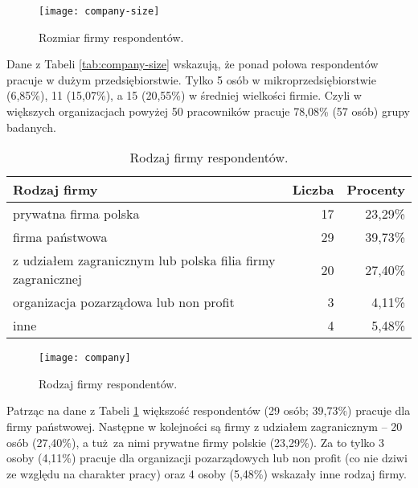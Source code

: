 \begin{figure}[htb]
\begin{center}
\texttt{[image: company-size]}
\end{center}
\caption{Rozmiar firmy respondentów.}
\label{fig:company-size}
\end{figure}

Dane z Tabeli \ref{tab:company-size} wskazują, że ponad połowa respondentów pracuje w dużym przedsiębiorstwie. Tylko 5 osób w mikroprzedsiębiorstwie (6,85\%), 11 (15,07\%), a 15 (20,55\%) w średniej wielkości firmie. Czyli w większych organizacjach powyżej 50 pracowników pracuje 78,08\% (57 osób) grupy badanych.

\begin{table}[h!]
\begin{center}
\begin{tabular}{l r r}
Rodzaj firmy & Liczba & Procenty \\ \hline
prywatna firma polska & 17 & 23,29\% \\
firma państwowa & 29 & 39,73\% \\
z udziałem zagranicznym lub polska filia firmy zagranicznej & 20 & 27,40\% \\
organizacja pozarządowa lub non profit & 3 & 4,11\% \\
inne & 4 & 5,48\% \\
\end{tabular}
\end{center}
\caption{Rodzaj firmy respondentów.}
\label{tab:company}
\end{table}

\begin{figure}[htb]
\begin{center}
\texttt{[image: company]}
\end{center}
\caption{Rodzaj firmy respondentów.}
\label{fig:company}
\end{figure}

Patrząc na dane z Tabeli \ref{tab:company} większość respondentów (29 osób; 39,73\%) pracuje dla firmy państwowej. Następne w kolejności są firmy z udziałem zagranicznym -- 20 osób (27,40\%), a tuż za nimi prywatne firmy polskie (23,29\%). Za to tylko 3 osoby (4,11\%) pracuje dla organizacji pozarządowych lub non profit (co nie dziwi ze względu na charakter pracy) oraz 4 osoby (5,48\%) wskazały inne rodzaj firmy.
